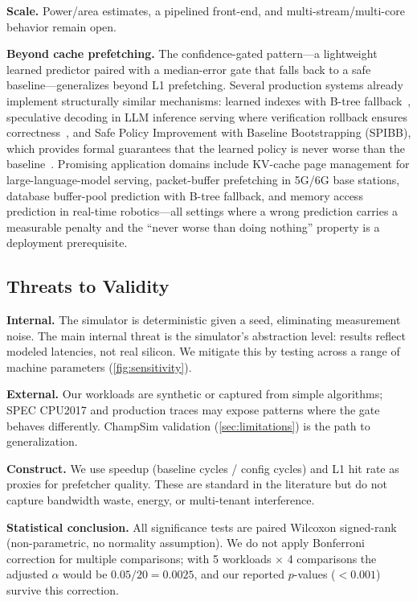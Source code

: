 \documentclass[conference]{IEEEtran}
\begin{document}
\textbf{Scale.} Power/area estimates, a pipelined front-end, and multi-stream/multi-core
behavior remain open.

\textbf{Beyond cache prefetching.}
The confidence-gated pattern---a lightweight learned predictor paired with a
median-error gate that falls back to a safe baseline---generalizes beyond
L1 prefetching. Several production systems already implement structurally
similar mechanisms: learned indexes with B-tree
fallback~\cite{kraska2018}, speculative decoding in LLM inference serving
where verification rollback ensures correctness~\cite{leviathan2023}, and
Safe Policy Improvement with Baseline Bootstrapping (SPIBB), which
provides formal guarantees that the learned policy is never worse than the
baseline~\cite{laroche2019}. Promising application domains include
KV-cache page management for large-language-model serving, packet-buffer
prefetching in 5G/6G base stations, database buffer-pool prediction with
B-tree fallback, and memory access prediction in real-time robotics---all
settings where a wrong prediction carries a measurable penalty and the
``never worse than doing nothing'' property is a deployment prerequisite.

\subsection{Threats to Validity}

\textbf{Internal.} The simulator is deterministic given a seed, eliminating
measurement noise. The main internal threat is the simulator's abstraction level:
results reflect modeled latencies, not real silicon. We mitigate this by testing
across a range of machine parameters (\cref{fig:sensitivity}).

\textbf{External.} Our workloads are synthetic or captured from simple algorithms;
SPEC CPU2017 and production traces may expose patterns where the gate behaves
differently. ChampSim validation (\cref{sec:limitations}) is the path to
generalization.

\textbf{Construct.} We use speedup (baseline cycles / config cycles) and L1 hit rate
as proxies for prefetcher quality. These are standard in the literature but do not
capture bandwidth waste, energy, or multi-tenant interference.

\textbf{Statistical conclusion.} All significance tests are paired Wilcoxon
signed-rank (non-parametric, no normality assumption). We do not apply
Bonferroni correction for multiple comparisons; with 5 workloads $\times$
4 comparisons the adjusted $\alpha$ would be $0.05/20 = 0.0025$, and our
reported $p$-values ($< 0.001$) survive this correction.
\end{document}
